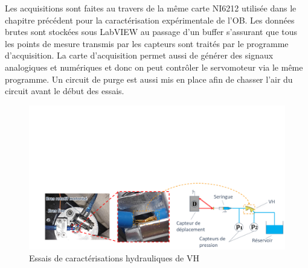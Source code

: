 Les acquisitions sont faites au travers de la même carte NI6212 utilisée dans le chapitre précédent pour la caractérisation expérimentale de l'OB. Les données brutes sont stockées sous LabVIEW au passage d'un buffer s'assurant que tous les points de mesure transmis par les capteurs sont traités par le programme d'acquisition. La carte d'acquisition permet aussi de générer des signaux analogiques et numériques et donc on peut contrôler le servomoteur via le même programme. Un circuit de purge est aussi mis en place afin de chasser l'air du circuit avant le début des essais.
\begin{figure}[!htb]
\begin{center}
    \captionsetup{justification=centering} 
	\includegraphics[trim={2cm 0cm 0cm 10cm},clip,width=\textwidth]{../Chap4/Figure/essais_hydraulique_VH.pdf}
	\caption{Essais de caractérisations hydrauliques de VH}
	\label{fig:essais_hydraulique_VH}
\end{center}	
\end{figure}    

